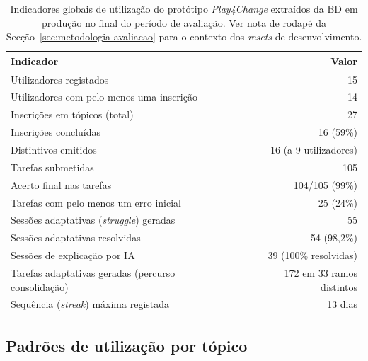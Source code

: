\begin{table}[htbp]
	\centering
	\small
	\begin{tabular}{p{8cm} r}
		\toprule
		\textbf{Indicador} & \textbf{Valor} \\
		\midrule
		Utilizadores registados                              & 15 \\
		Utilizadores com pelo menos uma inscrição            & 14 \\
		Inscrições em tópicos (total)                        & 27 \\
		Inscrições concluídas                                & 16 (59\%) \\
		Distintivos emitidos                                 & 16 (a 9 utilizadores) \\
		Tarefas submetidas                                   & 105 \\
		Acerto final nas tarefas                             & 104/105 (99\%) \\
		Tarefas com pelo menos um erro inicial               & 25 (24\%) \\
		Sessões adaptativas (\emph{struggle}) geradas        & 55 \\
		Sessões adaptativas resolvidas                       & 54 (98,2\%) \\
		Sessões de explicação por IA                         & 39 (100\% resolvidas) \\
		Tarefas adaptativas geradas (percurso consolidação)  & 172 em 33 ramos distintos \\
		Sequência (\emph{streak}) máxima registada           & 13 dias \\
		\bottomrule
	\end{tabular}
	\caption[Indicadores globais de utilização extraídos da base de dados em produção]{Indicadores globais de utilização do protótipo \emph{Play4Change} extraídos da BD em produção no final do período de avaliação. Ver nota de rodapé da Secção~\ref{sec:metodologia-avaliacao} para o contexto dos \emph{resets} de desenvolvimento.}
	\label{tab:stats-gerais}
\end{table}

\subsection{Padrões de utilização por tópico}
\label{ssec:conclusao-topicos}

